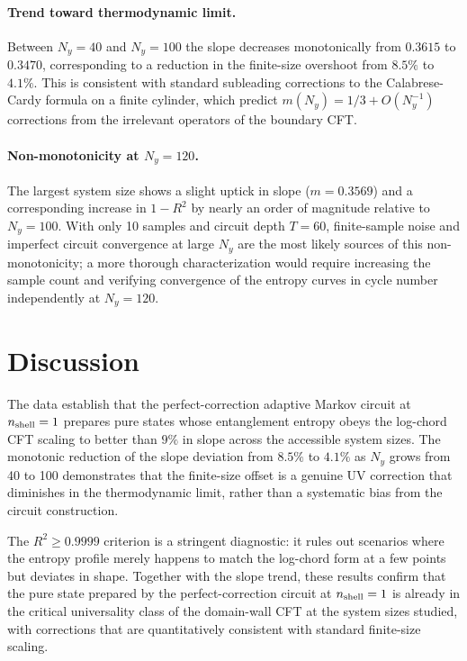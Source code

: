 \documentclass[aps,prb,twocolumn,showpacs,floatfix]{revtex4-2}
\newcommand{\Ny}{N_y}
\newcommand{\nshell}{n_{\rm shell}}
\begin{document}
\paragraph{Trend toward thermodynamic limit.}
Between $\Ny = 40$ and $\Ny = 100$ the slope decreases monotonically from
$0.3615$ to $0.3470$, corresponding to a reduction in the finite-size overshoot
from $8.5\%$ to $4.1\%$.
This is consistent with standard subleading corrections to the Calabrese-Cardy
formula on a finite cylinder, which predict $m(\Ny) = 1/3 + O(\Ny^{-1})$ corrections
from the irrelevant operators of the boundary CFT.

\paragraph{Non-monotonicity at $\Ny = 120$.}
The largest system size shows a slight uptick in slope ($m = 0.3569$) and a
corresponding increase in $1 - R^2$ by nearly an order of magnitude relative
to $\Ny = 100$.
With only 10 samples and circuit depth $T = 60$, finite-sample noise and
imperfect circuit convergence at large $\Ny$ are the most likely sources of this
non-monotonicity; a more thorough characterization would require increasing the
sample count and verifying convergence of the entropy curves in cycle number
independently at $\Ny = 120$.

\section{Discussion}
\label{sec:discussion}

The data establish that the perfect-correction adaptive Markov circuit at
$\nshell = 1$ prepares pure states whose entanglement entropy obeys the
log-chord CFT scaling to better than $9\%$ in slope across the accessible
system sizes.
The monotonic reduction of the slope deviation from $8.5\%$ to $4.1\%$ as
$\Ny$ grows from 40 to 100 demonstrates that the finite-size offset is a genuine
UV correction that diminishes in the thermodynamic limit, rather than a systematic
bias from the circuit construction.

The $R^2 \geq 0.9999$ criterion is a stringent diagnostic: it rules out scenarios
where the entropy profile merely happens to match the log-chord form at a few
points but deviates in shape.
Together with the slope trend, these results confirm that the pure state prepared
by the perfect-correction circuit at $\nshell = 1$ is already in the critical
universality class of the domain-wall CFT at the system sizes studied,
with corrections that are quantitatively consistent with standard finite-size
scaling.
\end{document}
